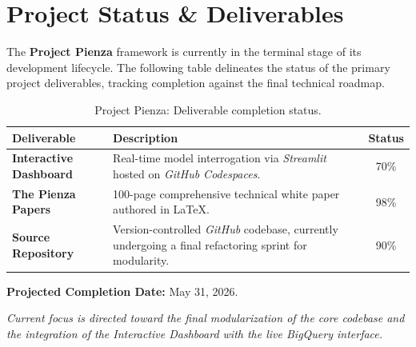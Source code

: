 \documentclass[10pt, letterpaper]{article}
\begin{document}
\section{Project Status \& Deliverables}

The \textbf{Project Pienza} framework is currently in the terminal stage of its development lifecycle. The following table delineates the status of the primary project deliverables, tracking completion against the final technical roadmap.

\begin{table}[H]
    \centering
    \small
    \begin{tabularx}{0.9\textwidth}{l X c}
        \toprule
        \textbf{Deliverable} & \textbf{Description} & \textbf{Status} \\
        \midrule
        \textbf{Interactive Dashboard} & Real-time model interrogation via \textit{Streamlit} hosted on \textit{GitHub Codespaces}. & 70\% \\
        \addlinespace[4pt]
        \textbf{The Pienza Papers} & 100-page comprehensive technical white paper authored in \LaTeX. & 98\% \\
        \addlinespace[4pt]
        \textbf{Source Repository} & Version-controlled \textit{GitHub} codebase, currently undergoing a final refactoring sprint for modularity. & 90\% \\
        \bottomrule
    \end{tabularx}
    \caption{Project Pienza: Deliverable completion status.}
    \label{tab:deliverables}
\end{table}

\vspace{0.4cm}
\noindent \textbf{Projected Completion Date:} May 31, 2026.

\vspace{0.2cm}
\noindent \textit{Current focus is directed toward the final modularization of the core codebase and the integration of the Interactive Dashboard with the live BigQuery interface.}
 
\end{document}
